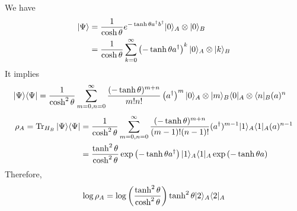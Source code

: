 We have 
\begin{equation}
	\begin{split}
	| \Psi \rangle & = \frac{1}{\cosh \theta} e^{-\tanh \theta a^{\dagger} b^{\dagger}} | 0 \rangle_A \otimes | 0 \rangle_B\\
	& = \frac{1}{\cosh \theta} \sum_{k=0}^{\infty} \left( - \tanh \theta a^{\dagger} \right)^k | 0 \rangle_A \otimes | k \rangle_B\\
	\end{split}
\end{equation}
It implies
\begin{equation}
	\begin{split}
	| \Psi \rangle \langle \Psi | & = \frac{1}{\cosh^2 \theta} \sum_{m=0,n=0}^{\infty}\frac{(-\tanh \theta)^{m+n}}{m!n!} \left(a^{\dagger} \right)^m | 0 \rangle_A \otimes | m \rangle_B \langle 0 |_A \otimes \langle n |_B (a)^n
	\end{split}
\end{equation}
\begin{equation}
\begin{split}
\rho_A = \operatorname{Tr}_{H_B} | \Psi \rangle \langle \Psi |& =\frac{1}{\cosh^2 \theta} \sum_{m=0,n=0}^{\infty} \frac{(-\tanh \theta)^{m+n}}{(m-1)!(n-1)!} (a^{\dagger})^{m-1}| 1 \rangle_A \langle 1 |_A (a)^{n-1}\\
& =  \frac{\tanh^2 \theta}{\cosh^2 \theta} \exp\left(-\tanh \theta a^{\dagger} \right) | 1 \rangle_A \langle 1 |_A \exp\left(-\tanh \theta a \right)
\end{split}
\end{equation}
Therefore, 
\begin{equation}
	\log \rho_A = \log \left( \frac{\tanh^2 \theta}{\cosh^2 \theta} \right) \tanh^2 \theta | 2 \rangle_A \langle 2 |_A
\end{equation}
